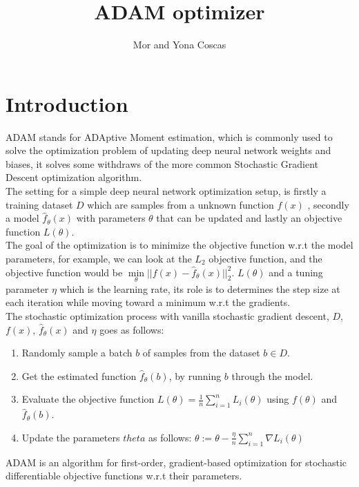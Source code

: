 \documentclass[10pt,a4paper]{article}
\title{\foreignlanguage{english}{ADAM optimizer}}
\author{Mor and Yona Coscas}
\begin{document}
\maketitle
\section{Introduction}
ADAM stands for ADAptive Moment estimation, which is commonly used to solve the optimization problem of updating deep neural network weights and biases, it solves some withdraws of the more common Stochastic Gradient Descent optimization algorithm.\\
The setting for a simple deep neural network optimization setup, is firstly a training dataset $D$ which are samples from a unknown function $f(x)$ , secondly a model $\hat{f}_{\theta}(x)$ with parameters $\theta$ that can be updated and lastly an objective function $L(\theta)$. \\
The goal of the optimization is to minimize the objective function w.r.t the model parameters, for example, we can look at the $L_2$ objective function, and the objective function would be $\min \limits_{\theta} ||f(x) - \hat{f}_\theta (x)||^{2}_2$. $L(\theta)$ and a tuning parameter $\eta$ which is the learning rate, its role is to determines the step size at each iteration while moving toward a minimum w.r.t the gradients. \\
The stochastic optimization process with vanilla stochastic gradient descent, $D$, $f(x)$, $\hat{f}_{\theta}(x)$ and $\eta$  goes as follows:
\begin{enumerate} 
    \item Randomly sample a batch $b$ of samples from the dataset $b \in D$.
    \item Get the estimated function $\hat{f}_{\theta}(b)$, by running $b$ through the model.
    \item Evaluate the objective function $L(\theta) = \frac{1}{n} \sum_{i=1}^{n} L_i(\theta)$ using $f(\theta)$ and $\hat{f}_{\theta}(b)$.
    \item Update the parameters $theta$ as follows: $\theta:=\theta-\frac{\eta}{n}\sum_{i=1}^{n}\nabla L_i(\theta)$
\end{enumerate}
ADAM is an algorithm for first-order, gradient-based optimization for stochastic differentiable objective functions w.r.t their parameters.
\end{document}
